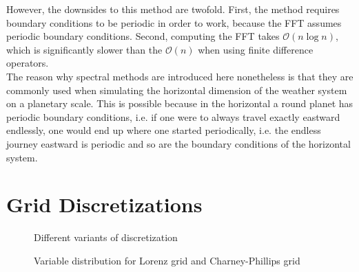 However, the downsides to this method are twofold.
First, the method requires boundary conditions to be periodic in order to work, because the FFT assumes periodic boundary conditions.
Second, computing the FFT takes $\mathcal{O}(n\log n)$, which is significantly slower than the $\mathcal{O}(n)$ when using finite difference operators.\\
The reason why spectral methods are introduced here nonetheless is that they are commonly used when simulating the horizontal dimension of the weather system on a planetary scale.
This is possible because in the horizontal a round planet has periodic boundary conditions, i.e. if one were to always travel exactly eastward endlessly, one would end up where one started periodically, i.e. the endless journey eastward is periodic and so are the boundary conditions of the horizontal system.

\section{Grid Discretizations}
\begin{figure}[ht]
    \caption{Different variants of discretization}
    \label{fig:grid_discretization}
\end{figure}
\begin{figure}[ht]
    \caption{Variable distribution for Lorenz grid and Charney-Phillips grid}
    \label{fig:lorenz_cp}
\end{figure}

